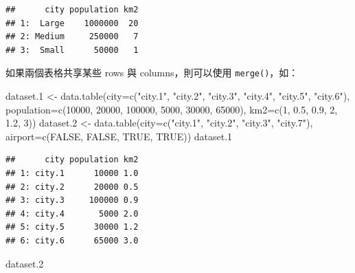 \documentclass[
]{book}
\newenvironment{Shaded}{\begin{snugshade}}{\end{snugshade}}
\newcommand{\AttributeTok}[1]{\textcolor[rgb]{0.77,0.63,0.00}{#1}}
\newcommand{\ConstantTok}[1]{\textcolor[rgb]{0.00,0.00,0.00}{#1}}
\newcommand{\DecValTok}[1]{\textcolor[rgb]{0.00,0.00,0.81}{#1}}
\newcommand{\FloatTok}[1]{\textcolor[rgb]{0.00,0.00,0.81}{#1}}
\newcommand{\FunctionTok}[1]{\textcolor[rgb]{0.00,0.00,0.00}{#1}}
\newcommand{\NormalTok}[1]{#1}
\newcommand{\OtherTok}[1]{\textcolor[rgb]{0.56,0.35,0.01}{#1}}
\newcommand{\StringTok}[1]{\textcolor[rgb]{0.31,0.60,0.02}{#1}}
\theoremstyle{definition}
\theoremstyle{remark}
\begin{document}
\begin{verbatim}
##      city population km2
## 1:  Large    1000000  20
## 2: Medium     250000   7
## 3:  Small      50000   1
\end{verbatim}

如果兩個表格共享某些 rows 與 columns，則可以使用 \texttt{merge()}，如：

\begin{Shaded}
\begin{Highlighting}[]
\NormalTok{dataset}\FloatTok{.1} \OtherTok{\textless{}{-}} \FunctionTok{data.table}\NormalTok{(}\AttributeTok{city=}\FunctionTok{c}\NormalTok{(}\StringTok{"city.1"}\NormalTok{, }\StringTok{"city.2"}\NormalTok{, }\StringTok{"city.3"}\NormalTok{, }\StringTok{"city.4"}\NormalTok{, }\StringTok{"city.5"}\NormalTok{, }\StringTok{"city.6"}\NormalTok{), }
                        \AttributeTok{population=}\FunctionTok{c}\NormalTok{(}\DecValTok{10000}\NormalTok{, }\DecValTok{20000}\NormalTok{, }\DecValTok{100000}\NormalTok{, }\DecValTok{5000}\NormalTok{, }\DecValTok{30000}\NormalTok{, }\DecValTok{65000}\NormalTok{),}
                        \AttributeTok{km2=}\FunctionTok{c}\NormalTok{(}\DecValTok{1}\NormalTok{, }\FloatTok{0.5}\NormalTok{, }\FloatTok{0.9}\NormalTok{, }\DecValTok{2}\NormalTok{, }\FloatTok{1.2}\NormalTok{, }\DecValTok{3}\NormalTok{))}
\NormalTok{dataset}\FloatTok{.2} \OtherTok{\textless{}{-}} \FunctionTok{data.table}\NormalTok{(}\AttributeTok{city=}\FunctionTok{c}\NormalTok{(}\StringTok{"city.1"}\NormalTok{, }\StringTok{"city.2"}\NormalTok{, }\StringTok{"city.3"}\NormalTok{, }\StringTok{"city.7"}\NormalTok{),}
                        \AttributeTok{airport=}\FunctionTok{c}\NormalTok{(}\ConstantTok{FALSE}\NormalTok{, }\ConstantTok{FALSE}\NormalTok{, }\ConstantTok{TRUE}\NormalTok{, }\ConstantTok{TRUE}\NormalTok{))}
\NormalTok{dataset}\FloatTok{.1}
\end{Highlighting}
\end{Shaded}

\begin{verbatim}
##      city population km2
## 1: city.1      10000 1.0
## 2: city.2      20000 0.5
## 3: city.3     100000 0.9
## 4: city.4       5000 2.0
## 5: city.5      30000 1.2
## 6: city.6      65000 3.0
\end{verbatim}

\begin{Shaded}
\begin{Highlighting}[]
\NormalTok{dataset}\FloatTok{.2}
\end{Highlighting}
\end{Shaded}
\end{document}
